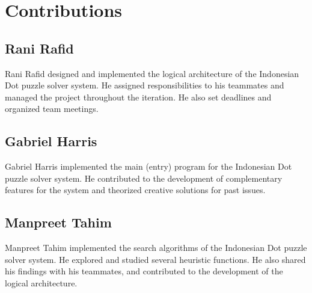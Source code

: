 \section{Contributions}

\subsection{Rani Rafid}

Rani Rafid designed and implemented the logical architecture of the Indonesian Dot puzzle solver system. He assigned responsibilities to his teammates and managed the project throughout the iteration. He also set deadlines and organized team meetings.

\subsection{Gabriel Harris}

Gabriel Harris implemented the main (entry) program for the Indonesian Dot puzzle solver system. He contributed to the development of complementary features for the system and theorized creative solutions for past issues.


\subsection{Manpreet Tahim}

Manpreet Tahim implemented the search algorithms of the Indonesian Dot puzzle solver system. He explored and studied several heuristic functions. He also shared his findings with his teammates, and contributed to the development of the logical architecture.

